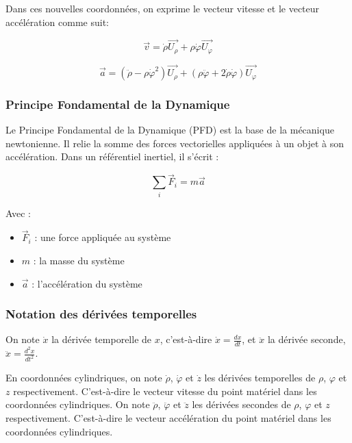 \documentclass[14pt]{article}
\begin{document}
Dans ces nouvelles coordonnées, on exprime le vecteur vitesse et le vecteur accélération comme suit:

\begin{equation}\label{eq:1.1.1a}
    \vec{v} = \dot{\rho} \vec{U_{\rho}} + \rho \dot{\varphi} \vec{U_{\varphi}}
    \tag{1.1.1a}
\end{equation}

\begin{equation}\label{eq:1.1.1b}
    \vec{a} = (\ddot{\rho} - \rho \dot{\varphi}^2) \vec{U_{\rho}} + (\rho\ddot{\varphi} + 2 \dot{\rho}\dot{\varphi}) \vec{U_{\varphi}}
    \tag{1.1.1b}
\end{equation}

\subsubsection{Principe Fondamental de la Dynamique}\label{PFD}

Le Principe Fondamental de la Dynamique (PFD) est la base de la mécanique newtonienne. Il relie la somme des forces vectorielles appliquées à un objet à son accélération. Dans un référentiel inertiel, il s'écrit :

\begin{equation} \label{eq:1.1.2}
    \sum_i \vec{F}_i = m \vec{a}
    \tag{1.1.2}
\end{equation}

Avec :
\begin{itemize}
    \item $\vec{F}_i$ : une force appliquée au système
    \item $m$ : la masse du système
    \item $\vec{a}$ : l'accélération du système
\end{itemize}

\subsubsection{Notation des dérivées temporelles}\label{deriv}

On note $\dot{x}$ la dérivée temporelle de $x$, c'est-à-dire $\dot{x} = \frac{dx}{dt}$, et $\ddot{x}$ la dérivée seconde, $\ddot{x} = \frac{d^2x}{dt^2}$.

En coordonnées cylindriques, on note $\dot{\rho}$, $\dot{\varphi}$ et $\dot{z}$ les dérivées temporelles de $\rho$, $\varphi$ et $z$ respectivement. C'est-à-dire le vecteur vitesse du point matériel dans les coordonnées cylindriques.
On note $\ddot{\rho}$, $\ddot{\varphi}$ et $\ddot{z}$ les dérivées secondes de $\rho$, $\varphi$ et $z$ respectivement. C'est-à-dire le vecteur accélération du point matériel dans les coordonnées cylindriques.
\end{document}
